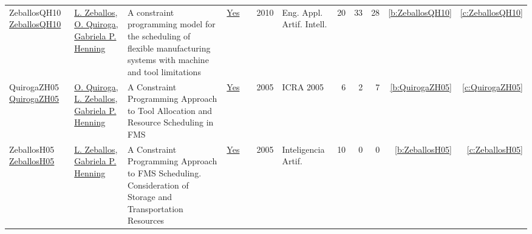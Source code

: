 {\begin{longtable}{>{\raggedright\arraybackslash}p{3cm}>{\raggedright\arraybackslash}p{6cm}>{\raggedright\arraybackslash}p{6.5cm}rrrp{2.5cm}rrrrr}
ZeballosQH10 \href{https://doi.org/10.1016/j.engappai.2009.07.002}{ZeballosQH10} & \hyperref[auth:a631]{L. Zeballos}, \hyperref[auth:a632]{O. Quiroga}, \hyperref[auth:a598]{Gabriela P. Henning} & A constraint programming model for the scheduling of flexible manufacturing systems with machine and tool limitations & \href{../works/ZeballosQH10.pdf}{Yes} & \cite{ZeballosQH10} & 2010 & Eng. Appl. Artif. Intell. & 20 & 33 & 28 & \ref{b:ZeballosQH10} & \ref{c:ZeballosQH10}\\
QuirogaZH05 \href{https://doi.org/10.1109/ROBOT.2005.1570686}{QuirogaZH05} & \hyperref[auth:a632]{O. Quiroga}, \hyperref[auth:a631]{L. Zeballos}, \hyperref[auth:a598]{Gabriela P. Henning} & A Constraint Programming Approach to Tool Allocation and Resource Scheduling in {FMS} & \href{../works/QuirogaZH05.pdf}{Yes} & \cite{QuirogaZH05} & 2005 & ICRA 2005 & 6 & 2 & 7 & \ref{b:QuirogaZH05} & \ref{c:QuirogaZH05}\\
ZeballosH05 \href{http://journal.iberamia.org/index.php/ia/article/view/452/article\%20\%281\%29.pdf}{ZeballosH05} & \hyperref[auth:a631]{L. Zeballos}, \hyperref[auth:a598]{Gabriela P. Henning} & A Constraint Programming Approach to {FMS} Scheduling. Consideration of Storage and Transportation Resources & \href{../works/ZeballosH05.pdf}{Yes} & \cite{ZeballosH05} & 2005 & Inteligencia Artif. & 10 & 0 & 0 & \ref{b:ZeballosH05} & \ref{c:ZeballosH05}\\
\end{longtable}
}

\clearpage
